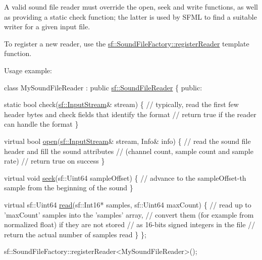 A valid sound file reader must override the open, seek and write functions, as well as providing a static check function; the latter is used by S\+F\+ML to find a suitable writer for a given input file.

To register a new reader, use the \hyperlink{classsf_1_1SoundFileFactory_acaf1f0bf1b7c7b9988ec76b33e33fe95}{sf\+::\+Sound\+File\+Factory\+::register\+Reader} template function.

Usage example\+: 
\begin{DoxyCode}
\textcolor{keyword}{class }MySoundFileReader : \textcolor{keyword}{public} \hyperlink{classsf_1_1SoundFileReader}{sf::SoundFileReader}
\{
\textcolor{keyword}{public}:

    \textcolor{keyword}{static} \textcolor{keywordtype}{bool} check(\hyperlink{classsf_1_1InputStream}{sf::InputStream}& stream)
    \{
        \textcolor{comment}{// typically, read the first few header bytes and check fields that identify the format}
        \textcolor{comment}{// return true if the reader can handle the format}
    \}

    \textcolor{keyword}{virtual} \textcolor{keywordtype}{bool} \hyperlink{classsf_1_1SoundFileReader_aa1d2fee2ba8f359c833ab74590d55935}{open}(\hyperlink{classsf_1_1InputStream}{sf::InputStream}& stream, Info& info)
    \{
        \textcolor{comment}{// read the sound file header and fill the sound attributes}
        \textcolor{comment}{// (channel count, sample count and sample rate)}
        \textcolor{comment}{// return true on success}
    \}

    \textcolor{keyword}{virtual} \textcolor{keywordtype}{void} \hyperlink{classsf_1_1SoundFileReader_a1e18ade5ffe882bdfa20a2ebe7e2b015}{seek}(sf::Uint64 sampleOffset)
    \{
        \textcolor{comment}{// advance to the sampleOffset-th sample from the beginning of the sound}
    \}

    \textcolor{keyword}{virtual} sf::Uint64 \hyperlink{classsf_1_1SoundFileReader_a3b7d86769ea07e24e7b0f0486bed7591}{read}(sf::Int16* samples, sf::Uint64 maxCount)
    \{
        \textcolor{comment}{// read up to 'maxCount' samples into the 'samples' array,}
        \textcolor{comment}{// convert them (for example from normalized float) if they are not stored}
        \textcolor{comment}{// as 16-bits signed integers in the file}
        \textcolor{comment}{// return the actual number of samples read}
    \}
\};

sf::SoundFileFactory::registerReader<MySoundFileReader>();
\end{DoxyCode}


